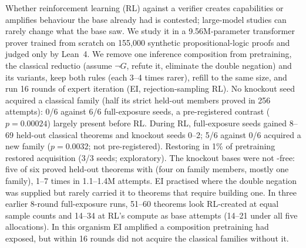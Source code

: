 Whether reinforcement learning (RL) against a verifier creates capabilities or amplifies behaviour the
base already had is contested; large-model studies can rarely change what the base saw. We study it in a
9.56M-parameter transformer prover trained from scratch on 155,000 synthetic propositional-logic proofs and judged only
by Lean~4. We remove one inference composition from pretraining, the classical reductio \sig{} (assume $\neg G$, refute
it, eliminate the double negation) \rv{} and its variants, keep both rules (each 3--4 times rarer), refill to
the same size, and run 16 rounds of expert iteration (EI, rejection-sampling RL). No knockout seed acquired a
classical family (half its \rv{} strict held-out members proved in 256 attempts): 0/6 against 6/6 full-exposure seeds, a
pre-registered contrast ($p=0.00024$) largely present before RL. During RL, full-exposure seeds gained 8--69 held-out
classical theorems and knockout seeds 0--2; 5/6 against 0/6 acquired a new family ($p=0.0032$; not pre-registered).
Restoring \sig{} in 1\% of pretraining restored acquisition (3/3 seeds; exploratory). The knockout bases were not
\sig-free: five of six proved held-out theorems with \sig{} \rv{} (four on family members, mostly one family), 1--7 times in
1.1--1.4M attempts. EI practised \sig{} where the double negation was supplied but rarely carried it to theorems that require building one. In
three earlier \rv{} 8-round full-exposure runs, 51--60 theorems look RL-created at equal sample counts \rv{} and 14--34 at
RL's compute as base attempts (14--21 under all five allocations). In this organism EI amplified a composition pretraining had exposed, but within 16
rounds did not acquire the classical families without it.

